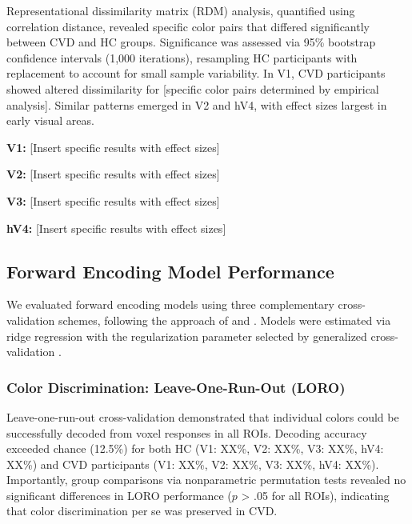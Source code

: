 Representational dissimilarity matrix (RDM) analysis, quantified using correlation distance, revealed specific color pairs that differed significantly between CVD and HC groups. Significance was assessed via 95\% bootstrap confidence intervals (1,000 iterations), resampling HC participants with replacement to account for small sample variability. In V1, CVD participants showed altered dissimilarity for [specific color pairs determined by empirical analysis]. Similar patterns emerged in V2 and hV4, with effect sizes largest in early visual areas.

\textbf{V1:} [Insert specific results with effect sizes]

\textbf{V2:} [Insert specific results with effect sizes]

\textbf{V3:} [Insert specific results with effect sizes]

\textbf{hV4:} [Insert specific results with effect sizes]


\subsection{Forward Encoding Model Performance}

We evaluated forward encoding models using three complementary cross-validation schemes, following the approach of \textcite{brouwer2009} and \textcite{brouwer2013}. Models were estimated via ridge regression with the regularization parameter selected by generalized cross-validation \cite{golub1979}.

\subsubsection{Color Discrimination: Leave-One-Run-Out (LORO)}

Leave-one-run-out cross-validation demonstrated that individual colors could be successfully decoded from voxel responses in all ROIs. Decoding accuracy exceeded chance (12.5\%) for both HC (V1: XX\%, V2: XX\%, V3: XX\%, hV4: XX\%) and CVD participants (V1: XX\%, V2: XX\%, V3: XX\%, hV4: XX\%). Importantly, group comparisons via nonparametric permutation tests \cite{nichols2002} revealed no significant differences in LORO performance ($p$ > .05 for all ROIs), indicating that color discrimination per se was preserved in CVD.

